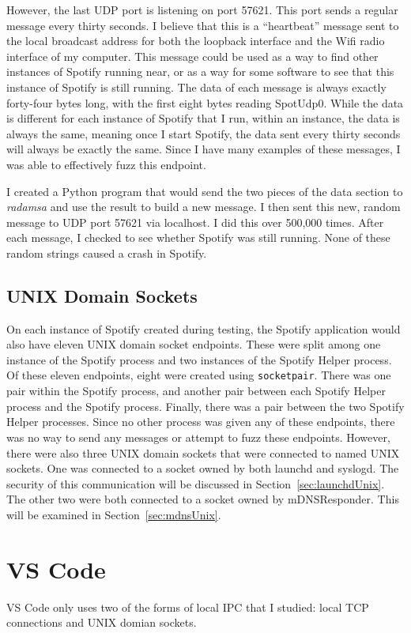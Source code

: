 However, the last UDP port is listening on port 57621.  This port sends a regular message every thirty seconds.  I believe that this is a ``heartbeat'' message sent to the local broadcast address for both the loopback interface and the Wifi radio interface of my computer.  This message could be used as a way to find other instances of Spotify running near, or as a way for some software to see that this instance of Spotify is still running.  The data of each message is always exactly forty-four bytes long, with the first eight bytes reading SpotUdp0.  While the data is different for each instance of Spotify that I run, within an instance, the data is always the same, meaning once I start Spotify, the data sent every thirty seconds will always be exactly the same.  Since I have many examples of these messages, I was able to effectively fuzz this endpoint.

I created a Python program that would send the two pieces of the data section to \textit{radamsa} and use the result to build a new message.  I then sent this new, random message to UDP port 57621 via localhost.  I did this over 500,000 times.  After each message, I checked to see whether Spotify was still running.  None of these random strings caused a crash in Spotify.

\subsection{UNIX Domain Sockets}
\label{sec:spotifyUnix}
On each instance of Spotify created during testing, the Spotify application would also have eleven UNIX domain socket endpoints.  These were split among one instance of the Spotify process and two instances of the Spotify Helper process.  Of these eleven endpoints, eight were created using \texttt{socketpair}.  There was one pair within the Spotify process, and another pair between each Spotify Helper process and the Spotify process.  Finally, there was a pair between the two Spotify Helper processes.  Since no other process was given any of these endpoints, there was no way to send any messages or attempt to fuzz these endpoints.  However, there were also three UNIX domain sockets that were connected to named UNIX sockets.  One was connected to a socket owned by both launchd and syslogd.  The security of this communication will be discussed in Section~\ref{sec:launchdUnix}.  The other two were both connected to a socket owned by mDNSResponder.  This will be examined in Section~\ref{sec:mdnsUnix}.

\section{VS Code}
\label{sec:code}
VS Code only uses two of the forms of local IPC that I studied: local TCP connections and UNIX domian sockets.  

